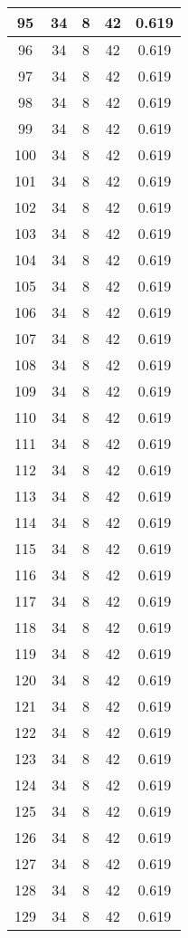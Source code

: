 \documentclass[letterpaper, 12pt]{article}
\begin{document}
\begin{longtable}{|c|c|c|c|c|}
\hline
95 & 34 & 8 & 42 & 0.619 \\
\hline
96 & 34 & 8 & 42 & 0.619 \\
\hline
97 & 34 & 8 & 42 & 0.619 \\
\hline
98 & 34 & 8 & 42 & 0.619 \\
\hline
99 & 34 & 8 & 42 & 0.619 \\
\hline
100 & 34 & 8 & 42 & 0.619 \\
\hline
101 & 34 & 8 & 42 & 0.619 \\
\hline
102 & 34 & 8 & 42 & 0.619 \\
\hline
103 & 34 & 8 & 42 & 0.619 \\
\hline
104 & 34 & 8 & 42 & 0.619 \\
\hline
105 & 34 & 8 & 42 & 0.619 \\
\hline
106 & 34 & 8 & 42 & 0.619 \\
\hline
107 & 34 & 8 & 42 & 0.619 \\
\hline
108 & 34 & 8 & 42 & 0.619 \\
\hline
109 & 34 & 8 & 42 & 0.619 \\
\hline
110 & 34 & 8 & 42 & 0.619 \\
\hline
111 & 34 & 8 & 42 & 0.619 \\
\hline
112 & 34 & 8 & 42 & 0.619 \\
\hline
113 & 34 & 8 & 42 & 0.619 \\
\hline
114 & 34 & 8 & 42 & 0.619 \\
\hline
115 & 34 & 8 & 42 & 0.619 \\
\hline
116 & 34 & 8 & 42 & 0.619 \\
\hline
117 & 34 & 8 & 42 & 0.619 \\
\hline
118 & 34 & 8 & 42 & 0.619 \\
\hline
119 & 34 & 8 & 42 & 0.619 \\
\hline
120 & 34 & 8 & 42 & 0.619 \\
\hline
121 & 34 & 8 & 42 & 0.619 \\
\hline
122 & 34 & 8 & 42 & 0.619 \\
\hline
123 & 34 & 8 & 42 & 0.619 \\
\hline
124 & 34 & 8 & 42 & 0.619 \\
\hline
125 & 34 & 8 & 42 & 0.619 \\
\hline
126 & 34 & 8 & 42 & 0.619 \\
\hline
127 & 34 & 8 & 42 & 0.619 \\
\hline
128 & 34 & 8 & 42 & 0.619 \\
\hline
129 & 34 & 8 & 42 & 0.619 \\

\end{longtable}
\end{document}
